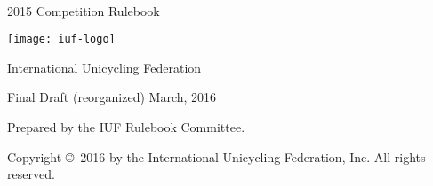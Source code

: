 \begin{titlepage}
\centering
\ \\
\vspace{5cm}
{\Huge 2015 Competition Rulebook}
\vspace{5mm}

\texttt{[image: iuf-logo]}

\vspace{5mm}
{\huge International Unicycling Federation}

\vspace{5mm}
{\Large Final Draft (reorganized) \quad March, 2016}

\vspace{50mm}
Prepared by the IUF Rulebook Committee.

\vspace{5mm}
{\small Copyright \copyright\ 2016 by the International Unicycling Federation, Inc. All rights reserved.}

\end{titlepage}
